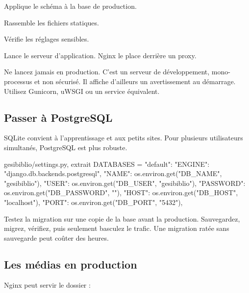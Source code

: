 \begin{description}[leftmargin=4.4cm,style=nextline]
  \item[\code{migrate}] Applique le schéma à la base de production.
  \item[\code{collectstatic}] Rassemble les fichiers statiques.
  \item[\code{check --deploy}] Vérifie les réglages sensibles.
  \item[\code{gunicorn}] Lance le serveur d'application. Nginx le place derrière
  un proxy.
\end{description}

\begin{attention}
Ne lancez jamais  en production. C'est un serveur de développement,
mono-processus et non sécurisé. Il affiche d'ailleurs un avertissement au
démarrage. Utilisez Gunicorn, uWSGI ou un service équivalent.
\end{attention}

\subsection{Passer à PostgreSQL}

SQLite convient à l'apprentissage et aux petits sites. Pour plusieurs utilisateurs
simultanés, PostgreSQL est plus robuste.

\begin{codebox}[python]{gesibiblio/settings.py, extrait}
DATABASES = {
    "default": {
        "ENGINE": "django.db.backends.postgresql",
        "NAME": os.environ.get("DB_NAME", "gesibiblio"),
        "USER": os.environ.get("DB_USER", "gesibiblio"),
        "PASSWORD": os.environ.get("DB_PASSWORD", ""),
        "HOST": os.environ.get("DB_HOST", "localhost"),
        "PORT": os.environ.get("DB_PORT", "5432"),
    }
}
\end{codebox}

\begin{bonne}
Testez la migration sur une copie de la base avant la production. Sauvegardez,
migrez, vérifiez, puis seulement basculez le trafic. Une migration ratée sans
sauvegarde peut coûter des heures.
\end{bonne}

\subsection{Les médias en production}

Nginx peut servir le dossier  :

